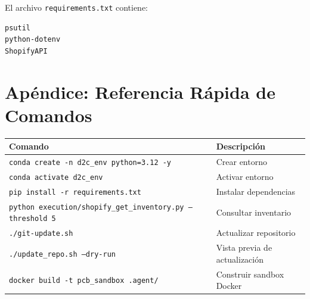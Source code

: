 \documentclass[a4paper,12pt]{article}
\begin{document}
El archivo \texttt{requirements.txt} contiene:

\begin{lstlisting}
psutil
python-dotenv
ShopifyAPI
\end{lstlisting}

\section{Apéndice: Referencia Rápida de Comandos}

\begin{center}
\begin{tabular}{|l|l|}
\hline
\textbf{Comando} & \textbf{Descripción} \\
\hline
\texttt{conda create -n d2c\_env python=3.12 -y} & Crear entorno \\
\texttt{conda activate d2c\_env} & Activar entorno \\
\texttt{pip install -r requirements.txt} & Instalar dependencias \\
\texttt{python execution/shopify\_get\_inventory.py --threshold 5} & Consultar inventario \\
\texttt{./git-update.sh} & Actualizar repositorio \\
\texttt{./update\_repo.sh --dry-run} & Vista previa de actualización \\
\texttt{docker build -t pcb\_sandbox .agent/} & Construir sandbox Docker \\
\hline
\end{tabular}
\end{center}
\end{document}
